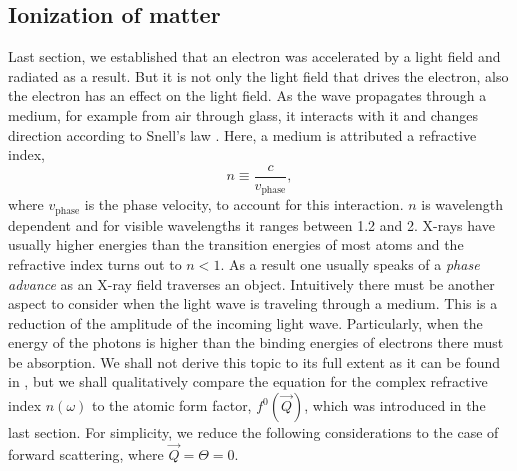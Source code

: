 \subsection{Ionization of matter}\label{sec:absorption}
Last section, we established that an electron was accelerated by a light field and radiated as a result.
But it is not only the light field that drives the electron, also the electron has an effect on the light field. As the wave propagates through a medium, for example from air through glass, it interacts with it and changes direction according to Snell's law \citep{Als-Nielson-2011-JWS}. Here, a medium is attributed a refractive index,
\begin{equation}
n\equiv\frac{c}{v_{\text{phase}}},
\label{eq:refractive-index}
\end{equation}
where $v_{\text{phase}}$ is the phase velocity, to account for this interaction. $n$ is wavelength dependent and for visible wavelengths it ranges between 1.2 and 2. X-rays have usually higher energies than the transition energies of most atoms and the refractive index turns out to $n<1$. As a result one usually speaks of a \textit{phase advance} as an X-ray field traverses an object.
Intuitively there must be another aspect to consider when the light wave is traveling through a medium. This is a reduction of the amplitude of the incoming light wave. Particularly, when the energy of the photons is higher than the binding energies of electrons there must be absorption. We shall not derive this topic to its full extent as it can be found in \citep[][p. 55 ff]{Attwood-2007-CUP}, but we shall qualitatively compare the equation for the complex refractive index $n\left(\omega\right)$ to the atomic form factor, $f^{0}\left(\vec{Q}\right)$, which was introduced in the last section. For simplicity, we reduce the following considerations to the case of forward scattering, where $\vec{Q}=\Theta=0$.\\[1\baselineskip]
